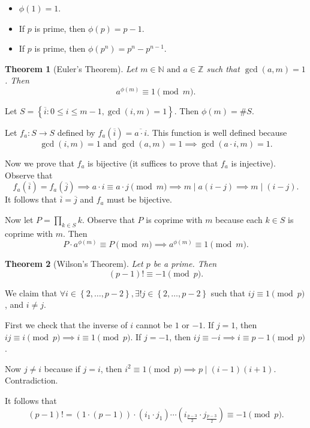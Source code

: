 \documentclass[11pt]{article}
\newtheorem{thm}{Theorem}[section]
\theoremstyle{definition}
\newcommand{\set}[1]{\left\{ #1 \right\}}
\newcommand{\rng}[2]{#1,\dots,#2}
\newcommand{\et}[0]{\text{ and }}
\newcommand{\ZZ}{\mathbb{Z}}
\newcommand{\NN}{\mathbb{N}}
\begin{document}
\begin{itemize}
	\item $\phi(1) = 1$.
	\item If $p$ is prime, then $\phi(p)=p-1$.
	\item If $p$ is prime, then $\phi(p^n) = p^{n} - p^{n-1}$.
\end{itemize}

\begin{thm}[Euler's Theorem] 
	Let $m\in\NN \et a\in\ZZ$ such that $\gcd(a,m)=1$. Then $$a^{\phi(m)} \equiv 1 \pmod{m}.$$
\end{thm}
\proof Let $S = \set{\overline{i}: 0\le i \le m-1, \gcd(i,m)=1}$. Then $\phi(m)=\#S$. 

Let $f_a:S\to S$ defined by $f_a(\overline{i}) = \overline{a\cdot i}$. 
This function is well defined because 
$$ \gcd(i,m)=1 \et \gcd(a,m)=1 \implies \gcd(a\cdot i, m) = 1 . $$

Now we prove that $f_a$ is bijective (it suffices to prove that $f_a$ is injective).
Observe that 
$$ f_a(\overline{i}) = f_a(\overline{j}) \implies a\cdot i \equiv a\cdot j \pmod{m} \implies m\mid a(i-j) \implies m\mid (i-j). $$
It follows that $\overline{i}=\overline{j}$ and $f_a$ must be bijective.

Now let $P = \prod_{k\in S}k$. Observe that $P$ is coprime with $m$ because each $k\in S$ is coprime with $m$. Then 
$$ P\cdot a^{\phi(m)} \equiv P \pmod{m} \implies a^{\phi(m)} \equiv 1 \pmod{m}. $$
\qedhere

\begin{thm}[Wilson's Theorem]
	Let $p$ be a prime. Then 
	$$ (p-1)! \equiv -1 \pmod{p}. $$
\end{thm}
\proof 
We claim that $\forall i\in\set{\rng{2}{p-2}}, \exists! j\in\set{\rng{2}{p-2}}$ such that $ij\equiv 1\pmod{p}$, and $i\neq j$.

First we check that the inverse of $i$ cannot be $1$ or $-1$. If $j=1$, then $ij\equiv i\pmod{p} \implies i\equiv 1 \pmod{p}$. If $j=-1$, then $ij\equiv -i \implies i\equiv p-1 \pmod{p}$. 

Now $j\neq i$ because if $j=i$, then $i^2\equiv 1 \pmod{p} \implies p\mid (i-1)(i+1)$. Contradiction.

It follows that 
$$ (p-1)! = (1\cdot(p-1)) \cdot (i_1\cdot j_1) \cdots (i_\frac{p-3}{2}\cdot j_\frac{p-3}{2}) \equiv -1 \pmod{p}. $$
\qedhere
\end{document}
